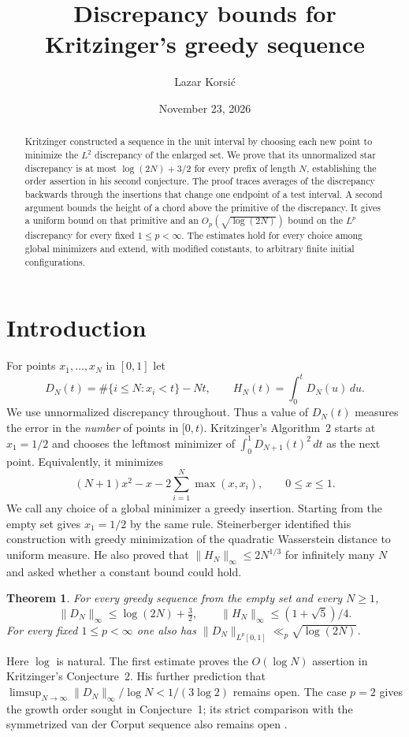 \documentclass[11pt,a4paper]{amsart}
\title{Discrepancy bounds for Kritzinger's greedy sequence}
\author{Lazar Korsi\'c}
\date{November 23, 2026}
\newtheorem{theorem}{Theorem}[section]
\newcommand{\norm}[1]{\lVert #1\rVert}
\begin{document}
\begin{abstract}
Kritzinger constructed a sequence in the unit interval by choosing each new
point to minimize the $L^2$ discrepancy of the enlarged set. We prove that
its unnormalized star discrepancy is at most $\log(2N)+3/2$ for every
prefix of length $N$, establishing the order assertion in his second
conjecture. The proof traces averages of the discrepancy backwards through
the insertions that change one endpoint of a test interval. A second argument
bounds the height of a chord above the primitive of the discrepancy. It
gives a uniform bound on that primitive and an $O_p(\sqrt{\log(2N)})$
bound on the $L^p$ discrepancy for every fixed $1\le p<\infty$.
The estimates hold for every choice among global minimizers and extend,
with modified constants, to arbitrary finite initial configurations.
\end{abstract}
\maketitle

\section{Introduction}
For points $x_1,\ldots,x_N$ in $[0,1]$ let
\[
 D_N(t)=\#\{i\le N:x_i<t\}-Nt,\qquad H_N(t)=\int_0^t D_N(u)\,du .
\]
We use unnormalized discrepancy throughout. Thus a value of $D_N(t)$
measures the error in the \emph{number} of points in $[0,t)$.
Kritzinger's Algorithm~2 \cite[\S4.1]{K} starts at $x_1=1/2$ and
chooses the leftmost minimizer of $\int_0^1 D_{N+1}(t)^2\,dt$ as the next
point. Equivalently, it minimizes
\begin{equation}\label{eq:rule}
 (N+1)x^2-x-2\sum_{i=1}^N\max(x,x_i),\qquad 0\le x\le1 .
\end{equation}
We call any choice of a global minimizer a greedy insertion. Starting
from the empty set gives $x_1=1/2$ by the same rule. Steinerberger
\cite{S} identified this construction with greedy minimization of the
quadratic Wasserstein distance to uniform measure. He also proved that
$\norm{H_N}_\infty\le 2N^{1/3}$ for infinitely many $N$ and asked
whether a constant bound could hold.

\begin{theorem}\label{th:main}
For every greedy sequence from the empty set and every $N\ge1$,
\[
 \norm{D_N}_\infty\le \log(2N)+\tfrac32,\qquad
 \norm{H_N}_\infty\le (1+\sqrt5)/4 .
\]
For every fixed $1\le p<\infty$ one also has
$\norm{D_N}_{L^p[0,1]}\ll_p\sqrt{\log(2N)}$.
\end{theorem}
Here $\log$ is natural. The first estimate proves the $O(\log N)$
assertion in Kritzinger's Conjecture~2. His further prediction that
$\limsup_{N\to\infty}\norm{D_N}_\infty/\log N<1/(3\log 2)$
remains open. The case $p=2$ gives the growth order sought in
Conjecture~1; its strict comparison with the symmetrized van der Corput
sequence also remains open \cite[\S4.1]{K}.
\end{document}
